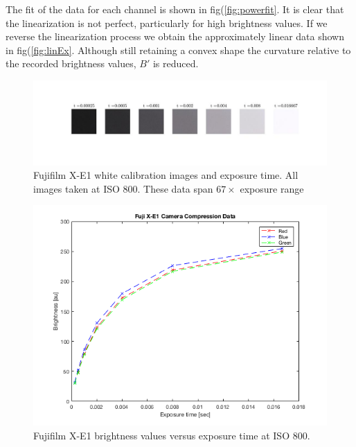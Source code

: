 \documentclass[a4paper]{article}
\begin{document}
The fit of the data for each channel is shown in fig(\ref{fig:powerfit}.  It is clear that the linearization is not perfect, particularly for high brightness values. If we reverse the linearization process we obtain the approximately linear data shown in fig(\ref{fig:linEx}.  Although still retaining a convex shape the curvature relative to the recorded brightness values, $B'$ is reduced. 
\begin{figure}[htb!]
    \begin{center}
        \includegraphics[width=\textwidth]{white_fuji.jpg}
	 \end{center}
    \caption{Fujifilm X-E1 white calibration images and exposure time. All images taken at ISO 800. These data span $67 \times$ exposure range} 
    \label{fig:white}
\end{figure}

\begin{figure}[htb!]
    \begin{center}
        \includegraphics[width=5in]{powerfit.png}
	 \end{center}
    \caption{Fujifilm X-E1 brightness values versus exposure time at ISO 800.} 
    \label{fig:Ecal}
\end{figure}
\end{document}
